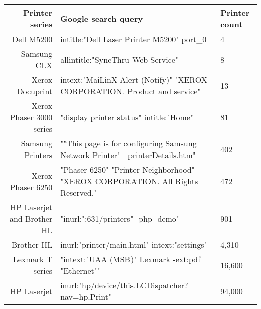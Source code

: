 \begin{table}
\label{printer_dorks}
\begin{tabular}{r| l | l}
    \hline
    \hline
    {\bf Printer series} & {\bf Google search query} & {\bf Printer count} \\
    \hline    
    Dell M5200 & intitle:"Dell Laser Printer M5200" port_0 & 4 \\
    Samsung CLX & allintitle:"SyncThru Web Service" & 8 \\
    Xerox Docuprint & intext:"MaiLinX Alert (Notify)" "XEROX CORPORATION. Product and service" & 13 \\
    Xerox Phaser 3000 series & "display printer status" intitle:"Home" & 81 \\
    Samsung Printers & ""This page is for configuring Samsung Network Printer" | printerDetails.htm" & 402 \\
    Xerox Phaser 6250 & "Phaser 6250" "Printer Neighborhood" "XEROX CORPORATION. All Rights Reserved." & 472 \\
    HP Laserjet and Brother HL & "inurl:":631/printers" -php -demo" & 901 \\
    Brother HL & inurl:"printer/main.html" intext:"settings" & 4,310 \\
    Lexmark T series & "intext:"UAA (MSB)"  Lexmark -ext:pdf "Ethernet"" & 16,600 \\
    HP Laserjet & inurl:"hp/device/this.LCDispatcher?nav=hp.Print" & 94,000 \\
    \hline
\end{tabular}
\end{table}
